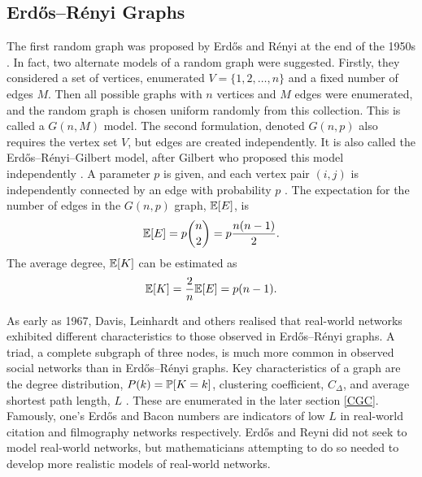  \subsection{Erd\H{o}s--R\'enyi Graphs}
 The first random graph was proposed by Erd\H{o}s and R\'enyi at the end of the 1950s \cite{RN53}. In fact, two alternate models of a random graph were suggested. Firstly, they considered a set of vertices, enumerated $V = \{1,2,\dots,n\}$ and a fixed number of edges $M$. Then all possible graphs with $n$ vertices and $M$ edges were enumerated, and the random graph is chosen uniform randomly from this collection. This is called a $G(n,M)$ model. The second formulation, denoted $G(n,p)$ also requires the vertex set $V$, but edges are created independently. It is also called the Erd\H{o}s--R\'enyi--Gilbert model, after Gilbert who proposed this model independently \cite{RN64}. A parameter $p$ is given, and each vertex pair $(i,j)$ is independently connected by an edge with probability $p$ \cite{RN56}. The expectation for the number of edges in the $G(n,p)$ graph, $\mathbb E [E]$, is \\
 \begin{align*}
     \mathbb E [E] = p {n \choose 2} = p\frac{n(n-1)}{2}.
 \end{align*}The average degree, $\mathbb E [K]$ can be estimated as \\
 \begin{align*}
     \mathbb E [K] = \frac{2}{n} \mathbb E [E] = p(n-1).
 \end{align*}
 
 As early as 1967, Davis, Leinhardt and others \cite{RN64} realised that real-world networks exhibited different characteristics to those observed in Erd\H{o}s--R\'enyi graphs. A triad, a complete subgraph of three nodes, is much more common in observed social networks than in Erd\H{o}s--R\'enyi graphs. Key characteristics of a graph are the degree distribution, $P(k) = \mathbb P [K=k]$, clustering coefficient, $C_\Delta$, and average shortest path length, $L$ \cite{RN53}. These are enumerated in the later section \ref{CGC}. \\
 
 Famously, one's Erd\H{o}s and Bacon numbers are indicators of low $L$ in real-world citation and filmography networks respectively. Erd\H{o}s and Reyni did not seek to model real-world networks, but mathematicians attempting to do so needed to develop more realistic models of real-world networks.\\
 
